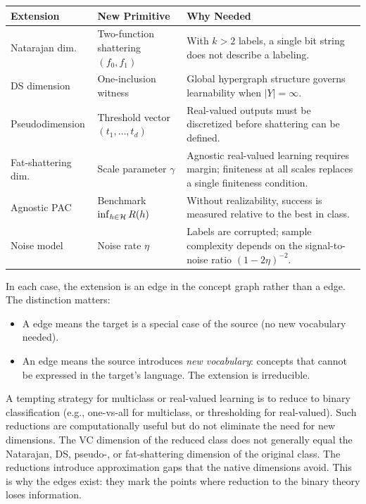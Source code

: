 \begin{center}\small
\begin{tabular}{llp{5.5cm}}
\toprule
\textbf{Extension} & \textbf{New Primitive} & \textbf{Why Needed} \\
\midrule
Natarajan dim. & Two-function shattering $(f_0, f_1)$
  & With $k > 2$ labels, a single bit string does not
    describe a labeling. \\[4pt]
DS dimension & One-inclusion witness
  & Global hypergraph structure governs learnability
    when $|Y| = \infty$. \\[4pt]
Pseudodimension & Threshold vector $(t_1, \ldots, t_d)$
  & Real-valued outputs must be discretized before
    shattering can be defined. \\[4pt]
Fat-shattering dim. & Scale parameter $\gamma$
  & Agnostic real-valued learning requires margin;
    finiteness at all scales replaces a single
    finiteness condition. \\[4pt]
Agnostic PAC & Benchmark $\inf_{h \in \mathcal{H}} R(h)$
  & Without realizability, success is measured relative
    to the best in class. \\[4pt]
Noise model & Noise rate $\eta$
  & Labels are corrupted; sample complexity depends on
    the signal-to-noise ratio $(1-2\eta)^{-2}$. \\
\bottomrule
\end{tabular}
\end{center}

In each case, the extension is an  edge in the concept
graph rather than a  edge.  The distinction matters:

\begin{itemize}[leftmargin=*,itemsep=3pt]
\item A  edge means the target is a special case of the source
  (no new vocabulary needed).
\item An  edge means the source introduces
  \emph{new vocabulary}: concepts that cannot be expressed in the target's
  language.  The extension is irreducible.
\end{itemize}

\begin{remark}
\label{rmk:non-reduction}
A tempting strategy for multiclass or real-valued learning is to reduce to
binary classification (e.g., one-vs-all for multiclass, or
thresholding for real-valued).  Such reductions are computationally useful but
do not eliminate the need for new dimensions.  The VC dimension of the
reduced class does not generally equal the Natarajan, DS, pseudo-, or
fat-shattering dimension of the original class.  The reductions introduce
approximation gaps that the native dimensions avoid.  This is why the
 edges exist: they mark the points where reduction to the
binary theory loses information.
\end{remark}


